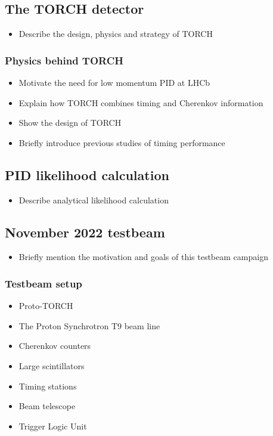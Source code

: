 \documentclass[12pt, a4paper, notitlepage, onecolumn]{article}
\begin{document}
\subsection{The TORCH detector}
  \begin{itemize}[nosep]
    \setlength{\itemindent}{2em}
    \item[\textendash]{Describe the design, physics and strategy of TORCH}
  \end{itemize}
\subsubsection{Physics behind TORCH}
  \begin{itemize}[nosep]
    \setlength{\itemindent}{2.5em}
    \item[\textasteriskcentered]{Motivate the need for low momentum PID at LHCb}
    \item[\textasteriskcentered]{Explain how TORCH combines timing and Cherenkov information}
    \item[\textasteriskcentered]{Show the design of TORCH}
    \item[\textasteriskcentered]{Briefly introduce previous studies of timing performance}
  \end{itemize}
\subsection{PID likelihood calculation}
  \begin{itemize}[nosep]
    \setlength{\itemindent}{2em}
    \item[\textendash]{Describe analytical likelihood calculation}
  \end{itemize}
\subsection{November 2022 testbeam}
  \begin{itemize}[nosep]
    \setlength{\itemindent}{2em}
    \item[\textendash]{Briefly mention the motivation and goals of this testbeam campaign}
  \end{itemize}
\subsubsection{Testbeam setup}
  \begin{itemize}[nosep]
    \setlength{\itemindent}{2.5em}
    \item[\textasteriskcentered]{Proto-TORCH}
    \item[\textasteriskcentered]{The Proton Synchrotron T9 beam line}
    \item[\textasteriskcentered]{Cherenkov counters}
    \item[\textasteriskcentered]{Large scintillators}
    \item[\textasteriskcentered]{Timing stations}
    \item[\textasteriskcentered]{Beam telescope}
    \item[\textasteriskcentered]{Trigger Logic Unit}
  \end{itemize}
\end{document}
